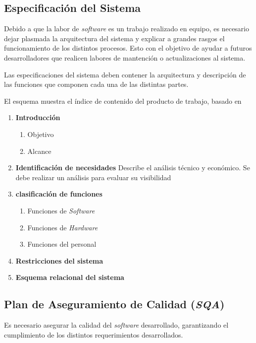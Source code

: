 \subsection{Especificación del Sistema}

Debido a que la labor de \emph{software} es un trabajo realizado en equipo, es necesario dejar plasmada la arquitectura del sistema y explicar a grandes rasgos el funcionamiento de los distintos procesos. Esto con el objetivo de ayudar a futuros desarrolladores que realicen labores de mantención o actualizaciones al sistema.

Las especificaciones del sistema deben contener la arquitectura y descripción de las funciones que componen cada una de las distintas partes.

El esquema muestra el índice de contenido del producto de trabajo, basado en \citet{mem00}

\begin{framed}
     \begin{enumerate}
		\item \textbf{Introducción}
		\begin{enumerate}
			\item Objetivo
			\item Alcance 
		\end{enumerate}
		\item \textbf{Identificación de necesidades}
		Describe el análisis técnico y económico. Se debe realizar un análisis para evaluar su visibilidad	
		\item \textbf{clasificación de funciones}
		\begin{enumerate}
			\item Funciones de \emph{Software}
			\item Funciones de \emph{Hardware}
			\item Funciones del personal
		\end{enumerate}		
		\item \textbf{Restricciones del sistema}
		\item \textbf{Esquema relacional del sistema}
	\end{enumerate}
\end{framed}

\subsection{Plan de Aseguramiento de Calidad (\emph{SQA})}
Es necesario asegurar la calidad del \emph{software} desarrollado, garantizando el cumplimiento de los distintos requerimientos desarrollados.

